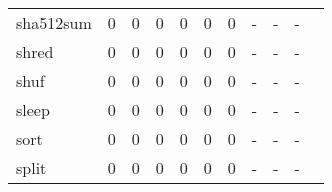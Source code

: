 \begin{longtable}{lp{1.20cm}p{1.20cm}p{1.20cm}p{1.20cm}p{1.20cm}p{1.20cm}p{1.20cm}p{1.20cm}p{1.20cm}p{1.20cm}}
sha512sum &                                     0 &                                                  0 &                                                  0 &                                                  0 &                                                  0 &                                                  0 &                                             - &                                                  - &                                                  - \\
shred     &                                     0 &                                                  0 &                                                  0 &                                                  0 &                                                  0 &                                                  0 &                                             - &                                                  - &                                                  - \\
shuf      &                                     0 &                                                  0 &                                                  0 &                                                  0 &                                                  0 &                                                  0 &                                             - &                                                  - &                                                  - \\
sleep     &                                     0 &                                                  0 &                                                  0 &                                                  0 &                                                  0 &                                                  0 &                                             - &                                                  - &                                                  - \\
sort      &                                     0 &                                                  0 &                                                  0 &                                                  0 &                                                  0 &                                                  0 &                                             - &                                                  - &                                                  - \\
split     &                                     0 &                                                  0 &                                                  0 &                                                  0 &                                                  0 &                                                  0 &                                             - &                                                  - &                                                  - \\

\end{longtable}
